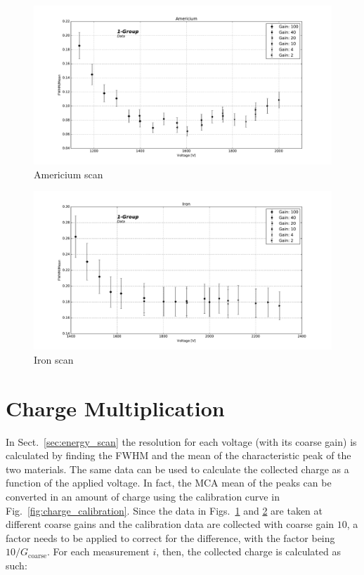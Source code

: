 \begin{figure}[htbp]
  \includegraphics[width=\linewidth]{graphics/americium_scan}
  \caption{Americium scan}
  \label{fig:resolution:americium}
\end{figure}

\begin{figure}[htbp]
  \includegraphics[width=\linewidth]{graphics/iron_scan}
  \caption{Iron scan}
  \label{fig:resolution:iron}
\end{figure}



\section{Charge Multiplication}
\label{sec:systematics}

In Sect.~\ref{sec:energy_scan} the resolution for each voltage (with its coarse gain) is calculated by finding the FWHM and the mean of the characteristic peak of the two materials.
The same data can be used to calculate the collected charge as a function of the applied voltage. In fact, the MCA mean of the peaks can be converted in an amount of charge using the calibration curve in Fig.~\ref{fig:charge_calibration}. Since the data in Figs.~\ref{fig:resolution:americium} and \ref{fig:resolution:iron} are taken at different coarse gains and the calibration data are collected with coarse gain $10$, a factor needs to be applied to correct for the difference, with the factor being $10/G_\mathrm{coarse}$. For each measurement $i$, then, the collected charge is calculated as such:

